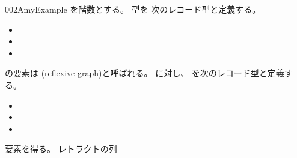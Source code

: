 \documentclass[index]{subfiles}
\begin{document}
\StartDefiningTabulars
\begin{myBlock}{002A}{myExample}
  を階数とする。
  型を
  次のレコード型と定義する。
  \begin{itemize}
    \item {}
    \item {}
    \item {}
  \end{itemize}
  の要素は
  (reflexive graph)と呼ばれる。
  に対し、
  を次のレコード型と定義する。
  \begin{itemize}
    \item {}
    \item {}
    \item {}
  \end{itemize}
  要素を得る。
  レトラクトの列
\end{myBlock}
\end{document}
